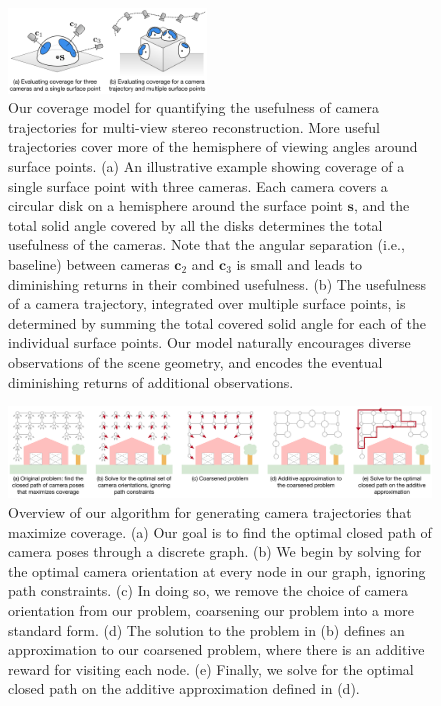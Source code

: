 \begin{figure}[t]
\begin{center}
\includegraphics[width=0.47\textwidth]{images/2017_iccv/coverage_model_horizontal.pdf}{\vspace{-7pt}}
\end{center}
\caption{
Our coverage model for quantifying the usefulness of camera trajectories for multi-view stereo reconstruction. More useful trajectories cover more of the hemisphere of viewing angles around surface points.
(a) An illustrative example showing coverage of a single surface point with three cameras. Each camera covers a circular disk on a hemisphere around the surface point $\mathbf{s}$, and the total solid angle covered by all the disks determines the total usefulness of the cameras.
Note that the angular separation (i.e., baseline) between cameras $\mathbf{c}_2$ and $\mathbf{c}_3$ is small and leads to diminishing returns in their combined usefulness.
(b) The usefulness of a camera trajectory, integrated over multiple surface points, is determined by summing the total covered solid angle for each of the individual surface points. Our model naturally encourages diverse observations of the scene geometry, and encodes the eventual diminishing returns of additional observations.
\vspace{-10pt}
}
\label{fig:coverage_model}
\end{figure}
%
\begin{figure}[t]
\begin{center}
\includegraphics[width=1.0\textwidth]{images/2017_iccv/algorithm_overview.pdf}{\vspace{-10pt}}
\end{center}
\caption{
Overview of our algorithm for generating camera trajectories that maximize coverage.
(a) Our goal is to find the optimal closed path of camera poses through a discrete graph.
(b) We begin by solving for the optimal camera orientation at every node in our graph, ignoring path constraints.
(c) In doing so, we remove the choice of camera orientation from our problem, coarsening our problem into a more standard form.
(d) The solution to the problem in (b) defines an approximation to our coarsened problem, where there is an additive reward for visiting each node.
(e) Finally, we solve for the optimal closed path on the additive approximation defined in (d).
\vspace{-10pt}
}
\label{fig:algorithm_overview}
\end{figure}

